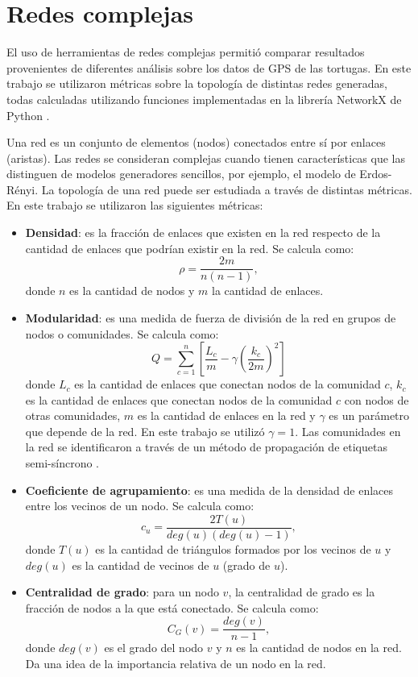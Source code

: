 \section{Redes complejas}
El uso de herramientas de redes complejas permitió comparar resultados provenientes de diferentes análisis sobre los datos de GPS de las tortugas. En este trabajo se utilizaron métricas sobre la topología de distintas redes generadas, todas calculadas utilizando  funciones implementadas en la librería NetworkX de Python \cite{networkx}.
 
Una red es un conjunto de elementos (nodos) conectados entre sí por enlaces (aristas). Las redes se consideran complejas cuando tienen características que las distinguen de modelos generadores sencillos, por ejemplo, el modelo de Erdos-Rényi. La topología de una red puede ser estudiada a través de distintas métricas. En este trabajo se utilizaron las siguientes métricas:
\begin{itemize}
    \item \textbf{Densidad}: es la fracción de enlaces que existen en la red respecto de la cantidad de enlaces que podrían existir en la red. Se calcula como:
    \begin{equation}
        \rho = \frac{2m}{n(n-1)},
    \end{equation}
    donde $n$ es la cantidad de nodos y $m$ la cantidad de enlaces.
    \item  \textbf{Modularidad}: es una medida de fuerza de división de la red en grupos de nodos o comunidades. Se calcula como:
    \begin{equation}
        Q = \sum_{c=1}^{n}
        \left[ \frac{L_c}{m} - \gamma\left( \frac{k_c}{2m} \right) ^2 \right]
    \end{equation}
    donde $L_c$ es la cantidad de enlaces que conectan nodos de la comunidad $c$, $k_c$ es la cantidad de enlaces que conectan nodos de la comunidad $c$ con nodos de otras comunidades, $m$ es la cantidad de enlaces en la red y $\gamma$ es un parámetro que depende de la red. En este trabajo se utilizó $\gamma = 1$. Las comunidades en la red se identificaron a través de un método de propagación de etiquetas semi-síncrono \cite{cordasco2010community}.
    \item \textbf{Coeficiente de agrupamiento}: es una medida de la densidad de enlaces entre los vecinos de un nodo. Se calcula como:
    \begin{equation}
        c_u = \frac{2 T(u)}{deg(u)(deg(u)-1)},
    \end{equation}
    donde $T(u)$ es la cantidad de triángulos formados por los vecinos de $u$ y $deg(u)$ es la cantidad de vecinos de $u$ (grado de $u$).
 
   \item \textbf{Centralidad de grado}: para un nodo $v$, la centralidad de grado es la fracción de nodos a la que está conectado. Se calcula como:
    \begin{equation}
        C_G(v) = \frac{deg(v)}{n-1},
    \end{equation}
    donde $deg(v)$ es el grado del nodo $v$ y $n$ es la cantidad de nodos en la red. Da una idea de la importancia relativa de un nodo en la red.
 
\end{itemize}
